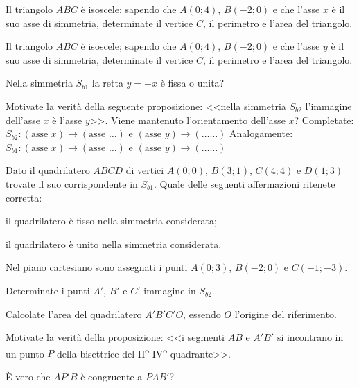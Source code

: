 \begin{esercizio}
  \label{ese:8.29} %
  Il triangolo $ABC$ è isoscele; sapendo che $A(0;4)$, $B(-2;0)$ e che 
  l'asse $x$ è il suo asse di simmetria, determinate il vertice $C$, il 
  perimetro e l'area del triangolo.
\end{esercizio}

\begin{esercizio}
  \label{ese:8.30} %
  Il triangolo $ABC$ è isoscele; sapendo che $A(0;4)$, $B(-2;0)$ e che 
  l'asse $y$ è il suo asse di simmetria, determinate il vertice $C$, il 
  perimetro e l'area del triangolo.
\end{esercizio}

\begin{esercizio}
  \label{ese:8.34} %
  Nella simmetria $S_{b1}$ la retta $y=-x$ è fissa o unita?
\end{esercizio}

\begin{esercizio}
  \label{ese:8.35} %
  Motivate la verità della seguente proposizione: <<nella simmetria 
  $S_{b2}$ l'immagine dell'asse $x$ è l'asse $y$>>. Viene mantenuto 
  l'orientamento dell'asse $x$?
  Completate: $S_{b2}:(\text{asse }x)\rightarrow (\text{asse } 
  \ldots{})$ e $(\text{asse }y)\rightarrow(\ldots\ldots{})$
  Analogamente: $S_{b1}:(\text{asse }x)\rightarrow (\text{asse } 
  \ldots{})$ e $(\text{asse }y)\rightarrow(\ldots\ldots{})$
\end{esercizio}

\begin{esercizio}
  \label{ese:8.36} %
  Dato il quadrilatero $ABCD$ di vertici $A(0;0)$, $B(3;1)$, $C(4;4)$ e 
  $D(1;3)$ trovate il suo corrispondente in $S_{b1}$. Quale delle 
  seguenti affermazioni ritenete corretta:
  \begin{enumeratea}
    \item il quadrilatero è fisso nella simmetria considerata;
    \item il quadrilatero è unito nella simmetria considerata.
  \end{enumeratea}
\end{esercizio}

\begin{esercizio}
  \label{ese:8.38} %
  Nel piano cartesiano sono assegnati i punti $A(0;3)$, $B(-2;0)$ e 
  $C(-1;-3)$.
  \begin{enumeratea}
    \item Determinate i punti $A'$, $B'$ e $C'$ immagine in $S_{b2}$.
    \item Calcolate l'area del quadrilatero $A'B'C'O$, essendo $O$ 
    l'origine del riferimento.
    \item Motivate la verità della proposizione: <<i segmenti $AB$ e 
    $A'B'$ si incontrano in un punto $P$ della bisettrice del 
    II\textsuperscript{o}-IV\textsuperscript{o} quadrante>>.
    \item \`E vero che $AP'B$ è congruente a $PAB'$?
  \end{enumeratea}
\end{esercizio}

